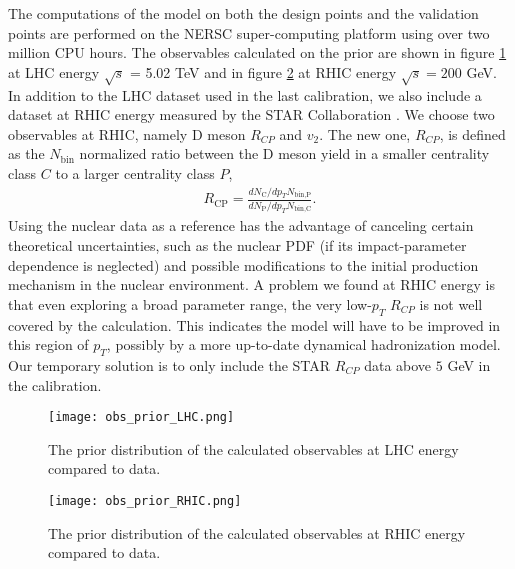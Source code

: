 The computations of the model on both the design points and the validation points are performed on the NERSC super-computing platform using over two million CPU hours.
The observables calculated on the prior are shown in figure \ref{fig:new:obs_prior_LHC} at LHC energy $\sqrt{s}$ = 5.02 TeV and in figure \ref{fig:new:obs_prior_RHIC} at RHIC energy $\sqrt{s} = 200$ GeV.
In addition to the LHC dataset used in the last calibration, we also include a dataset at RHIC energy measured by the STAR Collaboration \cite{Adamczyk:2017xur,Adam:2018inb}.
We choose two observables at RHIC, namely D meson $R_{CP}$ and $v_2$. 
The new one, $R_{CP}$, is defined as the $N_{\textrm{bin}}$ normalized ratio between the D meson yield in a smaller centrality class $C$ to a larger centrality class $P$,
\begin{eqnarray}
R_{\textrm{CP}} = \frac{dN_\textrm{C}/dp_T N_{\textrm{bin,P}}}{dN_\textrm{P}/dp_T N_{\textrm{bin,C}}}.
\end{eqnarray}
Using the nuclear data as a reference has the advantage of canceling certain theoretical uncertainties, such as the nuclear PDF (if its impact-parameter dependence is neglected) and possible modifications to the initial production mechanism in the nuclear environment.
A problem we found at RHIC energy is that even exploring a broad parameter range, the very low-$p_T$ $R_{CP}$ is not well covered by the calculation. 
This indicates the model will have to be improved in this region of $p_T$, possibly by a more up-to-date dynamical hadronization model.
Our temporary solution is to only include the STAR $R_{CP}$ data above $5$ GeV in the calibration.

\begin{figure}
\singlespacing
\centering
\texttt{[image: obs\_prior\_LHC.png]}
\caption[The prior distribution of the calculated observables at LHC]{The prior distribution of the calculated observables at LHC energy compared to data.}
\label{fig:new:obs_prior_LHC}
\end{figure}

\begin{figure}
\singlespacing
\centering
\texttt{[image: obs\_prior\_RHIC.png]}
\caption[The prior distribution of the calculated observables at RHIC]{The prior distribution of the calculated observables at RHIC energy compared to data.}
\label{fig:new:obs_prior_RHIC}
\end{figure}

